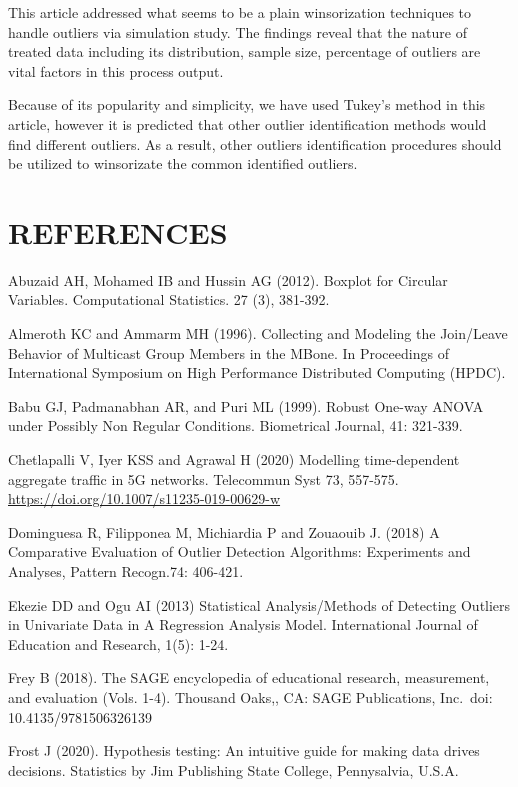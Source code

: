 \documentclass[notitlepage,12pt]{jedm}
\begin{document}
This article addressed what seems to be a plain winsorization techniques
to handle outliers via simulation study. The findings reveal that the
nature of treated data including its distribution, sample size,
percentage of outliers are vital factors in this process output.

Because of its popularity and simplicity, we have used Tukey's method in
this article, however it is predicted that other outlier identification
methods would find different outliers. As a result, other outliers
identification procedures should be utilized to winsorizate the common
identified outliers.

\hypertarget{references}{%
\section{REFERENCES}\label{references}}

Abuzaid AH, Mohamed IB and Hussin AG (2012). Boxplot for Circular
Variables. Computational Statistics. 27 (3), 381-392.

Almeroth KC and Ammarm MH (1996). Collecting and Modeling the Join/Leave
Behavior of Multicast Group Members in the MBone. In Proceedings of
International Symposium on High Performance Distributed Computing
(HPDC).

Babu GJ, Padmanabhan AR, and Puri ML (1999). Robust One-way ANOVA under
Possibly Non Regular Conditions. Biometrical Journal, 41: 321-339.

Chetlapalli V, Iyer KSS and Agrawal H (2020) Modelling time-dependent
aggregate traffic in 5G networks. Telecommun Syst 73, 557-575.
\url{https://doi.org/10.1007/s11235-019-00629-w}

Dominguesa R, Filipponea M, Michiardia P and Zouaouib J. (2018) A
Comparative Evaluation of Outlier Detection Algorithms: Experiments and
Analyses, Pattern Recogn.74: 406-421.

Ekezie DD and Ogu AI (2013) Statistical Analysis/Methods of Detecting
Outliers in Univariate Data in A Regression Analysis Model.
International Journal of Education and Research, 1(5): 1-24.

Frey B (2018). The SAGE encyclopedia of educational research,
measurement, and evaluation (Vols. 1-4). Thousand Oaks,, CA: SAGE
Publications, Inc.~doi: 10.4135/9781506326139

Frost J (2020). Hypothesis testing: An intuitive guide for making data
drives decisions. Statistics by Jim Publishing State College,
Pennysalvia, U.S.A.
\end{document}
